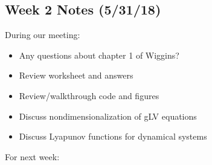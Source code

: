 \documentclass[]{article}
\date{}
\def\tightlist{}
\begin{document}
\subsection{Week 2 Notes (5/31/18)}\label{week-2-notes-53118}

During our meeting:

\begin{itemize}
\tightlist
\item
  Any questions about chapter 1 of Wiggins?
\item
  Review worksheet and answers
\item
  Review/walkthrough code and figures
\item
  Discuss nondimensionalization of gLV equations
\item
  Discuss Lyapunov functions for dynamical systems
\end{itemize}

For next week:
\end{document}
